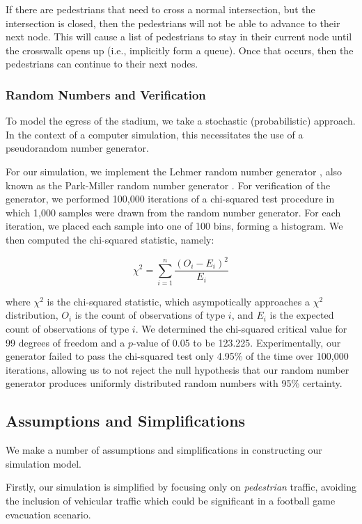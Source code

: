 \documentclass[12pt]{article}
\begin{document}
If there are pedestrians that need to cross a normal intersection, but the
intersection is closed, then the pedestrians will not be able to advance to
their next node. This will cause a list of pedestrians to stay in their
current node until the crosswalk opens up (i.e., implicitly form a queue).
Once that occurs, then the pedestrians can continue to their next nodes.

\subsubsection{Random Numbers and Verification}
To model the egress of the stadium, we take a stochastic (probabilistic)
approach. In the context of a computer simulation, this necessitates the use of
a pseudorandom number generator.

For our simulation, we implement the Lehmer random number generator
\cite{payne1969coding}, also known as the Park-Miller random number generator
\cite{park1988random}. For verification of the generator, we performed
100,000 iterations of a chi-squared test procedure in which 1,000 samples were
drawn from the random number generator. For each iteration, we placed each
sample into one of 100 bins, forming a histogram. We then computed the
chi-squared statistic, namely:

\begin{equation}
{\chi}^2=\sum_{i=1}^{n} \frac{(O_i - E_i)^2}{E_i}
\end{equation}

where ${\chi}^2$ is the chi-squared statistic, which asympotically approaches
a ${\chi}^2$ distribution, $O_i$ is the count of observations of type $i$,
and $E_i$ is the expected count of observations of type $i$. We determined the
chi-squared critical value for 99 degrees of freedom and a $p$-value of 0.05 to be
123.225. Experimentally, our generator failed to pass the chi-squared test only
4.95\% of the time over 100,000 iterations, allowing us to not reject the null
hypothesis that our random number generator produces uniformly distributed
random numbers with 95\% certainty.

\subsection{Assumptions and Simplifications}
We make a number of assumptions and simplifications in constructing our
simulation model.

Firstly, our simulation is simplified by focusing only on
\textit{pedestrian} traffic, avoiding the inclusion of vehicular traffic which
could be significant in a football game evacuation scenario.
\end{document}
